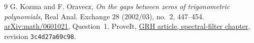 \documentclass[11pt]{article}
\begin{document}
\begin{thebibliography}{9}
 G. Kozma and F. Oravecz,
\emph{On the gaps between zeros of trigonometric polynomials},
Real Anal. Exchange 28 (2002/03), no.~2, 447--454.
\href{https://arxiv.org/abs/math/0601021}{arXiv:math/0601021},
Question~1.
ProveIt,
\href{https://github.com/VladimirReshetnikov/ProveIt/blob/3c4d27a69c98d09319a51e41a19fca05bb80a3e2/Analysis/GeneralizedRiemannHypothesis/Article/sections/fil.tex}{GRH article, spectral-filter chapter},
revision \texttt{3c4d27a69c98}.
\end{thebibliography}
\end{document}
